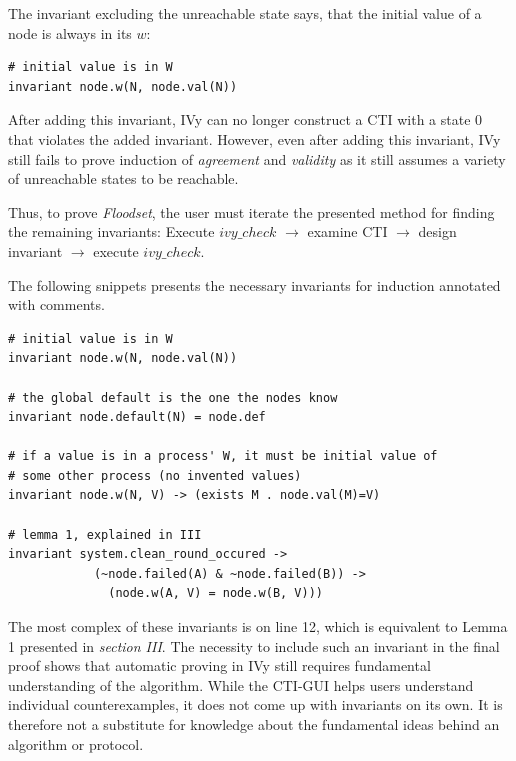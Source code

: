 \documentclass[fleqn]{article}
\begin{document}
The invariant excluding the unreachable state says, that the initial value of a node is always in its $w$:
\begin{mdframed}[nobreak=true, backgroundcolor=light-gray, roundcorner=10pt,leftmargin=1, rightmargin=1, innerleftmargin=15, innertopmargin=15,innerbottommargin=15, outerlinewidth=1, linecolor=light-gray]
\begin{lstlisting}
# initial value is in W
invariant node.w(N, node.val(N))
\end{lstlisting}
\end{mdframed}

After adding this invariant, IVy can no longer construct a CTI with a state 0 that violates the added invariant. However, even after adding this invariant, IVy still fails to prove induction of \textit{agreement} and \textit{validity} as it still assumes a variety of unreachable states to be reachable.

Thus, to prove \textit{Floodset}, the user must iterate the presented method for finding the remaining invariants: Execute $ivy\_check$ $\rightarrow$ examine CTI $\rightarrow$ design invariant $\rightarrow$ execute $ivy\_check$.

The following snippets presents the necessary invariants for induction annotated with comments.
\begin{mdframed}[nobreak=true, backgroundcolor=light-gray, roundcorner=10pt,leftmargin=1, rightmargin=1, innerleftmargin=15, innertopmargin=15,innerbottommargin=15, outerlinewidth=1, linecolor=light-gray]
\begin{lstlisting}
# initial value is in W
invariant node.w(N, node.val(N))

# the global default is the one the nodes know
invariant node.default(N) = node.def

# if a value is in a process' W, it must be initial value of
# some other process (no invented values)
invariant node.w(N, V) -> (exists M . node.val(M)=V)

# lemma 1, explained in III
invariant system.clean_round_occured ->
            (~node.failed(A) & ~node.failed(B)) ->
              (node.w(A, V) = node.w(B, V)))
\end{lstlisting}
\end{mdframed}

The most complex of these invariants is on line 12, which is equivalent to Lemma 1 presented in \textit{section III}. The necessity to include such an invariant in the final proof shows that automatic proving in IVy still requires fundamental understanding of the algorithm. While the CTI-GUI helps users understand individual counterexamples, it does not come up with invariants on its own. It is therefore not a substitute for knowledge about the fundamental ideas behind an algorithm or protocol.
\end{document}
